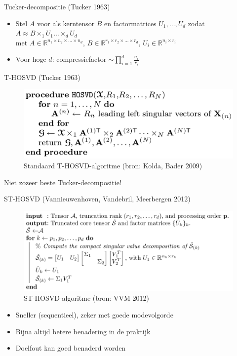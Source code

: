 \documentclass[t,12pt,dutch
\ifx\beamermode\undefined\else,\beamermode\fi
]{beamer}
\begin{document}
\begin{frame}{Tucker-decompositie (Tucker 1963)}

\begin{itemize}
\item Stel $A$ voor als kerntensor $B$ en factormatrices $U_1, \dots, U_d$ zodat\\
$A \approx B \times_1 U_1 \dots \times_d U_d$\\
met $A \in \mathbb{R}^{n_1 \times n_2 \times \dots \times n_d}$, $B \in \mathbb{R}^{r_1 \times r_2 \times \dots \times r_d}$, $U_i \in \mathbb{R}^{n_i \times r_i}$
\item Voor hoge $d$: compressiefactor $\sim \prod_{i=1}^{d}\frac{n_i}{r_i}$
\end{itemize}

\end{frame}

\begin{frame}{T-HOSVD (Tucker 1963)}

\begin{figure}[H]
\centering
\includegraphics[scale=0.3]{images/T-HOSVD.png}
\caption{Standaard T-HOSVD-algoritme (bron: Kolda, Bader 2009)}
\end{figure}

Niet zozeer beste Tucker-decompositie!

\end{frame}

\begin{frame}{ST-HOSVD (Vannieuwenhoven, Vandebril, Meerbergen 2012)}

\begin{figure}[H]
\centering
\includegraphics[scale=0.25]{images/ST-HOSVD.png}
\caption{ST-HOSVD-algoritme (bron: VVM 2012)}
\end{figure}

\begin{itemize}
\item Sneller (sequentieel), zeker met goede modevolgorde
\item Bijna altijd betere benadering in de praktijk
\item Doelfout kan goed benaderd worden
\end{itemize}

\end{frame}
\end{document}
